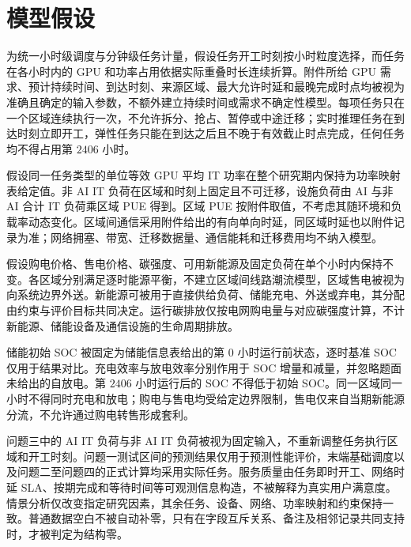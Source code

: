 \section{模型假设}

为统一小时级调度与分钟级任务计量，假设任务开工时刻按小时粒度选择，而任务在各小时内的 GPU 和功率占用依据实际重叠时长连续折算。附件所给 GPU 需求、预计持续时间、到达时刻、来源区域、最大允许时延和最晚完成时点均被视为准确且确定的输入参数，不额外建立持续时间或需求不确定性模型。每项任务只在一个区域连续执行一次，不允许拆分、抢占、暂停或中途迁移；实时推理任务在到达时刻立即开工，弹性任务只能在到达之后且不晚于有效截止时点完成，任何任务均不得占用第 $2406$ 小时。

假设同一任务类型的单位等效 GPU 平均 IT 功率在整个研究期内保持为功率映射表给定值。非 AI IT 负荷在区域和时刻上固定且不可迁移，设施负荷由 AI 与非 AI 合计 IT 负荷乘区域 PUE 得到。区域 PUE 按附件取值，不考虑其随环境和负载率动态变化。区域间通信采用附件给出的有向单向时延，同区域时延也以附件记录为准；网络拥塞、带宽、迁移数据量、通信能耗和迁移费用均不纳入模型。

假设购电价格、售电价格、碳强度、可用新能源及固定负荷在单个小时内保持不变。各区域分别满足逐时能源平衡，不建立区域间线路潮流模型，区域售电被视为向系统边界外送。新能源可被用于直接供给负荷、储能充电、外送或弃电，其分配由约束与评价目标共同决定。运行碳排放仅按电网购电量与对应碳强度计算，不计新能源、储能设备及通信设施的生命周期排放。

储能初始 SOC 被固定为储能信息表给出的第 $0$ 小时运行前状态，逐时基准 SOC 仅用于结果对比。充电效率与放电效率分别作用于 SOC 增量和减量，并忽略题面未给出的自放电。第 $2406$ 小时运行后的 SOC 不得低于初始 SOC。同一区域同一小时不得同时充电和放电；购电与售电均受给定边界限制，售电仅来自当期新能源分流，不允许通过购电转售形成套利。

问题三中的 AI IT 负荷与非 AI IT 负荷被视为固定输入，不重新调整任务执行区域和开工时刻。问题一测试区间的预测结果仅用于预测性能评价，末端基础调度以及问题二至问题四的正式计算均采用实际任务。服务质量由任务即时开工、网络时延 SLA、按期完成和等待时间等可观测信息构造，不被解释为真实用户满意度。情景分析仅改变指定研究因素，其余任务、设备、网络、功率映射和约束保持一致。普通数据空白不被自动补零，只有在字段互斥关系、备注及相邻记录共同支持时，才被判定为结构零。
